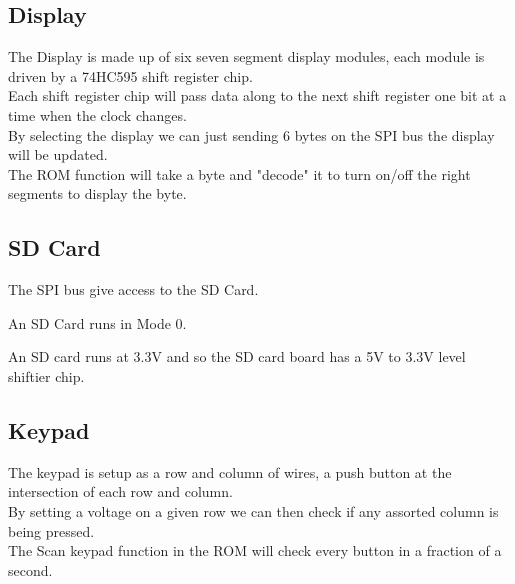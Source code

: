 \documentclass{ol-softwaremanual}
\begin{document}
\begin{ffcode}
\pagebreak

\subsection{Display}
The Display is made up of six seven segment display modules, each module is driven by a 74HC595 shift register chip.\\

Each shift register chip will pass data along to the next shift register one bit at a time when the clock changes.\\

By selecting the display we can just sending 6 bytes on the SPI bus the display will be updated.\\

The ROM function will take a byte and "decode" it to turn on/off the right segments to display the byte.


\subsection{SD Card}
The SPI bus give access to the SD Card.

An SD Card runs in Mode 0.

An SD card runs at 3.3V and so the SD card board has a 5V to 3.3V level shiftier chip.


\subsection{Keypad}
The keypad is setup as a row and column of wires, a push button at the intersection of each row and column.\\

By setting a voltage on a given row we can then check if any assorted column is being pressed.\\

The Scan keypad function in the ROM will check every button in a fraction of a second.\\

\pagebreak


\end{ffcode}
\end{document}
